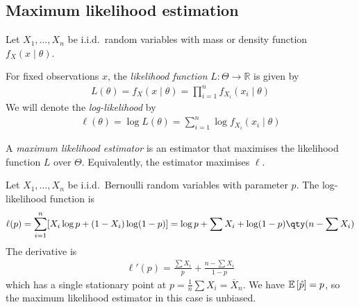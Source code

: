 \subsection{Maximum likelihood estimation}
Let $X_1, \dots, X_n$ be i.i.d.\ random variables with mass or density function $f_X(x \mid \theta)$.
\begin{definition}
	For fixed observations $x$, the \textit{likelihood function} $L \colon \Theta \to \mathbb R$ is given by
	\begin{align*}
		L(\theta) = f_X(x \mid \theta) = \prod_{i=1}^n f_{X_i} (x_i \mid \theta)
	\end{align*}
	We will denote the \textit{log-likelihood} by
	\begin{align*}
		\ell(\theta) = \log L(\theta) = \sum_{i=1}^n \log f_{X_i} (x_i \mid \theta)
	\end{align*}
\end{definition}
\begin{definition}
	A \textit{maximum likelihood estimator} is an estimator that maximises the likelihood function $L$ over $\Theta$.
	Equivalently, the estimator maximises $\ell$.
\end{definition}
\begin{example}
	Let $X_1, \dots, X_n$ be i.i.d.\ Bernoulli random variables with parameter $p$.
	The log-likelihood function is
	\begin{align*}
		\ell(p) = \sum_{i=1}^n [X_i \log p + (1-X_i) \log (1-p)] = \log p + \sum X_i + \log(1-p) \qty(n - \sum X_i)
	\end{align*}
	The derivative is
	\begin{align*}
		\ell'(p) = \frac{\sum X_i}{p} + \frac{n - \sum X_i}{1-p}
	\end{align*}
	which has a single stationary point at $p = \frac{1}{n} \sum X_i = \overline X_n$.
	We have $\mathbb{E}\left[{\hat p}\right] = p$, so the maximum likelihood estimator in this case is unbiased.
\end{example}

